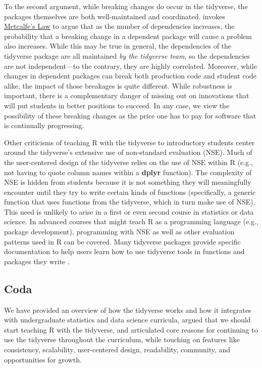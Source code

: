 \documentclass[12pt]{article}
\begin{document}
To the second argument, while breaking changes do occur in the
tidyverse, the packages themselves are both well-maintained and
coordinated. \citet{eddelbuettel2018} invokes
\href{https://en.wikipedia.org/wiki/Metcalfe\%27s_law}{Metcalfe's Law}
to argue that as the number of dependencies increases, the probability
that a breaking change in a dependent package will cause a problem also
increases. While this may be true in general, the dependencies of the
tidyverse package are all maintained \emph{by the tidyverse team}, so
the dependencies are not independent---to the contrary, they are highly
correlated. Moreover, while changes in dependent packages can break both
production code and student code alike, the impact of those breakages is
quite different. While robustness is important, there is a complementary
danger of missing out on innovations that will put students in better
positions to succeed. In any case, we view the possibility of these
breaking changes as the price one has to pay for software that is
continually progressing.

Other criticisms of teaching R with the tidyverse to introductory
students center around the tidyverse's extensive use of non-standard
evaluation (NSE). Much of the user-centered design of the tidyverse
relies on the use of NSE within R (e.g., not having to quote column
names within a \textbf{dplyr} function). The complexity of NSE is hidden
from students because it is not something they will meaningfully
encounter until they try to write certain kinds of functions
(specifically, a generic function that uses functions from the
tidyverse, which in turn make use of NSE). This need is unlikely to
arise in a first or even second course in statistics or data science. In
advanced courses that might teach R as a programming language (e.g.,
package development), programming with NSE as well as other evaluation
patterns used in R can be covered. Many tidyverse packages provide
specific documentation to help users learn how to use tidyverse tools in
functions and packages they write
\citep{programdplyr, ggplot2inpackage}.

\hypertarget{coda}{%
\subsection{Coda}\label{coda}}

We have provided an overview of how the tidyverse works and how it
integrates with undergraduate statistics and data science curricula,
argued that we should start teaching R with the tidyverse, and
articulated core reasons for continuing to use the tidyverse throughout
the curriculum, while touching on features like consistency,
scalability, user-centered design, readability, community, and
opportunities for growth.
\end{document}
